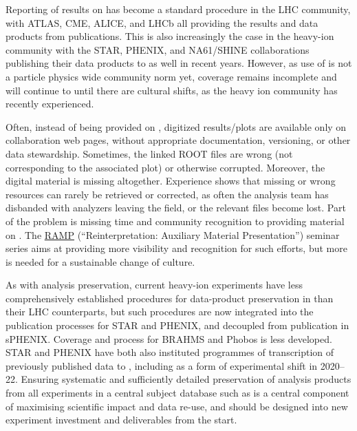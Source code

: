 \documentclass[11pt]{article}
\begin{document}
Reporting of results on \hepdata has become a standard procedure in the LHC community, with ATLAS, CME, ALICE, and LHCb all providing the results and data products from publications.
This is also increasingly the case in the heavy-ion community with the STAR, PHENIX, and NA61/SHINE collaborations publishing their data products to \hepdata as well in recent years.
However, as use of \hepdata is not a particle physics wide community norm yet, coverage remains incomplete and will continue to until there are cultural shifts, as the heavy ion community has recently experienced.
% 

Often, instead of being provided on \hepdata, digitized results/plots are available only on collaboration web pages, without appropriate documentation, versioning, or other data stewardship.
Sometimes, the linked ROOT files are wrong (not corresponding to the associated plot) or otherwise corrupted.
Moreover, the digital material is missing altogether.
Experience shows that missing or wrong resources can rarely be retrieved or corrected, as often the analysis team has disbanded with analyzers leaving the field, or the relevant files become lost. 
Part of the problem is missing time and community recognition to providing material on \hepdata.
The \href{https://indico.cern.ch/category/14155/}{RAMP} (``Reinterpretation: Auxiliary Material Presentation'') seminar series aims at providing more visibility and recognition for such efforts,  but more is needed for a 
sustainable change of culture. 

As with analysis preservation, current heavy-ion experiments have less comprehensively established procedures for data-product preservation in \hepdata than their LHC counterparts, but such procedures are now integrated into the publication processes for STAR and PHENIX, and decoupled from publication in sPHENIX. Coverage and process for BRAHMS and Phobos is less developed. STAR and PHENIX have both also instituted programmes of transcription of previously published data to \hepdata, including as a form of experimental shift in 2020--22. Ensuring systematic and sufficiently detailed preservation of analysis products from all experiments in a central subject database such as \hepdata is a central component of maximising scientific impact and data re-use, and should be designed into new experiment investment and deliverables from the start. 
\end{document}
